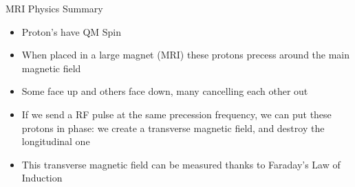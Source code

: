 \documentclass[aspectratio=169,xcolor=dvipsnames]{beamer}
\begin{document}

\begin{frame}{MRI Physics Summary}

\begin{itemize}
\item Proton's have QM Spin
\item When placed in a large magnet (MRI) these protons precess around the main magnetic field
\item Some face up and others face down, many cancelling each other out
\item If we send a RF pulse at the same precession frequency, we can put these protons in phase: we create a transverse magnetic field, and destroy the longitudinal one
\item This transverse magnetic field can be measured thanks to Faraday's Law of Induction
\end{itemize}

\end{frame}

\end{document}
